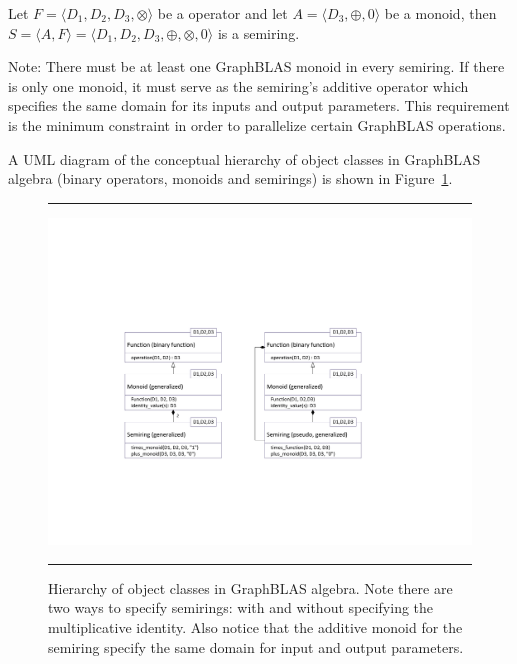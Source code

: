 Let $F = \langle D_1,D_2,D_3,\otimes \rangle$ be a operator
and let $A = \langle D_3,\oplus,0 \rangle$ be a monoid,
then $S= \langle A,F \rangle = \langle D_1,D_2,D_3,\oplus,\otimes,0 \rangle$
is a semiring.

Note: There must be at least one GraphBLAS monoid in every semiring. If there 
is only one monoid, it must serve as the semiring's additive operator which
specifies the same domain for its inputs and output parameters. This 
requirement is the minimum constraint in order to parallelize certain 
GraphBLAS operations.

A UML diagram of the conceptual hierarchy of object classes in GraphBLAS
algebra (binary operators, monoids and semirings) is shown in 
Figure~\ref{Fig:AlgebraHierarchy}.

\begin{figure}[htb]
    \hrule
    \begin{center}
        \includegraphics[width=1.0\linewidth,trim=1.5in 2in 1.5in 2in]{Algebra_Hierarchy.pdf}
    \end{center}
    \caption{Hierarchy of object classes in GraphBLAS algebra. Note there are 
    two ways to specify semirings: with and without specifying the
    multiplicative identity.  Also notice that the additive monoid for the
    semiring specify the same domain for input and output parameters.}
    \label{Fig:AlgebraHierarchy}
    \hrule
\end{figure}

